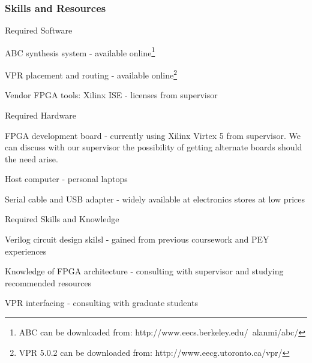 \subsubsection{Skills and Resources}

\begin{itemlist}
	\item Required Software \
		\begin{itemlist}
			\item ABC synthesis system - available online\footnote{ABC can be downloaded from: http://www.eecs.berkeley.edu/~alanmi/abc/}
			\item VPR placement and routing - available online\footnote{VPR 5.0.2 can be downloaded from: http://www.eecg.utoronto.ca/vpr/}
			\item Vendor FPGA tools: Xilinx ISE - licenses from supervisor
		\end{itemlist}
	\item Required Hardware \
		\begin{itemlist}
			\item FPGA development board - currently using Xilinx Virtex 5 from supervisor.
We can discuss with our supervisor the possibility of getting alternate boards should the need arise.
			\item Host computer - personal laptops
			\item Serial cable and USB adapter - widely available at electronics stores at low prices
		\end{itemlist}
	\item Required Skills and Knowledge \
		\begin{itemlist}
			\item Verilog circuit design skilsl - gained from previous coursework and PEY experiences
			\item Knowledge of FPGA architecture - consulting with supervisor and studying recommended resources
			\item VPR interfacing - consulting with graduate students
		\end{itemlist}
\end{itemlist}


